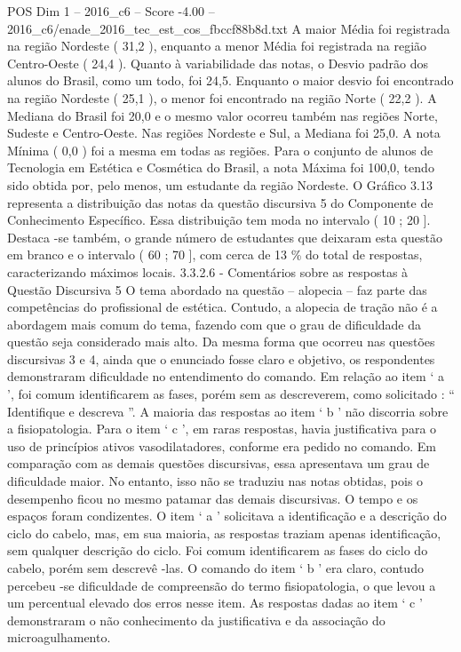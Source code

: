 \begin{textsample}{POS Dim 1 – 2016\_c6 – Score -4.00 – 2016\_c6/enade\_2016\_tec\_est\_cos\_fbccf88b8d.txt}
A maior Média foi registrada na região Nordeste ( 31,2 ), enquanto a menor Média foi registrada na região Centro-Oeste ( 24,4 ).
Quanto à variabilidade das notas, o Desvio padrão dos alunos do Brasil, como um todo, foi 24,5.
Enquanto o maior desvio foi encontrado na região Nordeste ( 25,1 ), o menor foi encontrado na região Norte ( 22,2 ).
A Mediana do Brasil foi 20,0 e o mesmo valor ocorreu também nas regiões Norte, Sudeste e Centro-Oeste.
Nas regiões Nordeste e Sul, a Mediana foi 25,0.
A nota Mínima ( 0,0 ) foi a mesma em todas as regiões.
Para o conjunto de alunos de Tecnologia em Estética e Cosmética do Brasil, a nota Máxima foi 100,0, tendo sido obtida por, pelo menos, um estudante da região Nordeste.
O Gráfico 3.13 representa a distribuição das notas da questão discursiva 5 do Componente de Conhecimento Específico.
Essa distribuição tem moda no intervalo ( 10 ; 20 ].
Destaca -se também, o grande número de estudantes que deixaram esta questão em branco e o intervalo ( 60 ; 70 ], com cerca de 13 \% do total de respostas, caracterizando máximos locais. 3.3.2.6 - Comentários sobre as respostas à Questão Discursiva 5 O tema abordado na questão – alopecia – faz parte das competências do profissional de estética.
Contudo, a alopecia de tração não é a abordagem mais comum do tema, fazendo com que o grau de dificuldade da questão seja considerado mais alto.
Da mesma forma que ocorreu nas questões discursivas 3 e 4, ainda que o enunciado fosse claro e objetivo, os respondentes demonstraram dificuldade no entendimento do comando.
Em relação ao item ‘ a ’, foi comum identificarem as fases, porém sem as descreverem, como solicitado : “ Identifique e descreva ”.
A maioria das respostas ao item ‘ b ’ não discorria sobre a fisiopatologia.
Para o item ‘ c ’, em raras respostas, havia justificativa para o uso de princípios ativos vasodilatadores, conforme era pedido no comando.
Em comparação com as demais questões discursivas, essa apresentava um grau de dificuldade maior.
No entanto, isso não se traduziu nas notas obtidas, pois o desempenho ficou no mesmo patamar das demais discursivas.
O tempo e os espaços foram condizentes.
O item ‘ a ’ solicitava a identificação e a descrição do ciclo do cabelo, mas, em sua maioria, as respostas traziam apenas identificação, sem qualquer descrição do ciclo.
Foi comum identificarem as fases do ciclo do cabelo, porém sem descrevê -las.
O comando do item ‘ b ’ era claro, contudo percebeu -se dificuldade de compreensão do termo fisiopatologia, o que levou a um percentual elevado dos erros nesse item.
As respostas dadas ao item ‘ c ’ demonstraram o não conhecimento da justificativa e da associação do microagulhamento.

\end{textsample}
